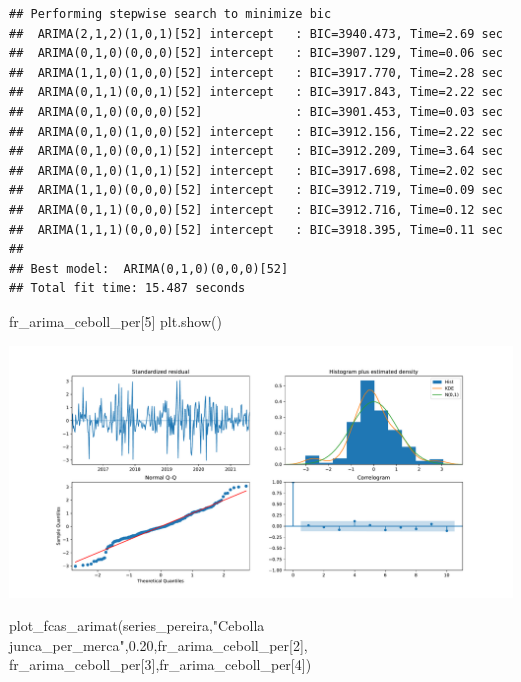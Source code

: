 \documentclass[
]{book}
\newenvironment{Shaded}{\begin{snugshade}}{\end{snugshade}}
\newcommand{\DecValTok}[1]{\textcolor[rgb]{0.00,0.00,0.81}{#1}}
\newcommand{\FloatTok}[1]{\textcolor[rgb]{0.00,0.00,0.81}{#1}}
\newcommand{\NormalTok}[1]{#1}
\newcommand{\StringTok}[1]{\textcolor[rgb]{0.31,0.60,0.02}{#1}}
\begin{document}
\begin{verbatim}
## Performing stepwise search to minimize bic
##  ARIMA(2,1,2)(1,0,1)[52] intercept   : BIC=3940.473, Time=2.69 sec
##  ARIMA(0,1,0)(0,0,0)[52] intercept   : BIC=3907.129, Time=0.06 sec
##  ARIMA(1,1,0)(1,0,0)[52] intercept   : BIC=3917.770, Time=2.28 sec
##  ARIMA(0,1,1)(0,0,1)[52] intercept   : BIC=3917.843, Time=2.22 sec
##  ARIMA(0,1,0)(0,0,0)[52]             : BIC=3901.453, Time=0.03 sec
##  ARIMA(0,1,0)(1,0,0)[52] intercept   : BIC=3912.156, Time=2.22 sec
##  ARIMA(0,1,0)(0,0,1)[52] intercept   : BIC=3912.209, Time=3.64 sec
##  ARIMA(0,1,0)(1,0,1)[52] intercept   : BIC=3917.698, Time=2.02 sec
##  ARIMA(1,1,0)(0,0,0)[52] intercept   : BIC=3912.719, Time=0.09 sec
##  ARIMA(0,1,1)(0,0,0)[52] intercept   : BIC=3912.716, Time=0.12 sec
##  ARIMA(1,1,1)(0,0,0)[52] intercept   : BIC=3918.395, Time=0.11 sec
## 
## Best model:  ARIMA(0,1,0)(0,0,0)[52]          
## Total fit time: 15.487 seconds
\end{verbatim}

\begin{Shaded}
\begin{Highlighting}[]
\NormalTok{fr\_arima\_ceboll\_per[}\DecValTok{5}\NormalTok{]}
\NormalTok{plt.show()}
\end{Highlighting}
\end{Shaded}

\includegraphics{bookdown-demo_files/figure-latex/unnamed-chunk-163-157.pdf}

\begin{Shaded}
\begin{Highlighting}[]

\NormalTok{plot\_fcas\_arimat(series\_pereira,}\StringTok{"Cebolla junca\_per\_merca"}\NormalTok{,}\FloatTok{0.20}\NormalTok{,fr\_arima\_ceboll\_per[}\DecValTok{2}\NormalTok{],}
\NormalTok{fr\_arima\_ceboll\_per[}\DecValTok{3}\NormalTok{],fr\_arima\_ceboll\_per[}\DecValTok{4}\NormalTok{])}
\end{Highlighting}
\end{Shaded}
\end{document}
